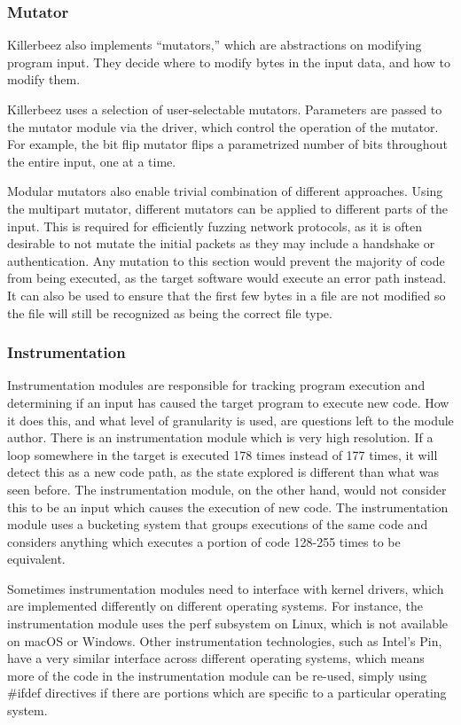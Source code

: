 \subsubsection{Mutator} \label{Mutator Overview}
Killerbeez also implements ``mutators,'' which are abstractions on modifying
program input. They decide where to modify bytes in the input data, and how
to modify them.

Killerbeez uses a selection of user-selectable mutators. Parameters are passed
to the mutator module via the driver, which control the operation of the
mutator. For example, the bit flip mutator flips a parametrized number of bits
throughout the entire input, one at a time.

Modular mutators also enable trivial combination of different approaches. Using
the multipart mutator, different mutators can be applied to different parts of
the input. This is required for efficiently fuzzing network protocols, as it is
often desirable to not mutate the initial packets as they may include a handshake or
authentication.  Any mutation to this section would prevent the majority of code from being
executed, as the target software would execute an error path instead. It can
also be used to ensure that the first few bytes in a file are not modified so
the file will still be recognized as being the correct file type.


\subsubsection{Instrumentation} \label{Instrumentation Overview}
Instrumentation modules are responsible for tracking program execution and
determining if an input has caused the target program to execute new code. How it does this,
and what level of granularity is used, are questions left to the module author.
There is an \IPT{} instrumentation module which is very high resolution.
If a loop somewhere in the target is executed 178 times instead of 177
times, it will detect this as a new code path, as the state explored is
different than what was seen before.  The \AFL{} instrumentation module, on the
other hand, would not consider this to be an input which causes the execution of new code.
The \AFL{} instrumentation module uses a bucketing system that groups executions of the same
code and considers anything which executes a portion of code 128-255 times to
be equivalent.

Sometimes instrumentation modules need to interface with kernel drivers, which are
implemented differently on different operating systems. For instance, the \IPT{}
instrumentation module uses the perf subsystem on Linux, which is not available
on macOS or Windows. Other instrumentation technologies, such as Intel's
Pin,\cite{pin} have a very similar interface across different operating
systems, which means more of the code in the instrumentation module can be
re-used, simply using \#ifdef directives if there are portions which are
specific to a particular operating system.
